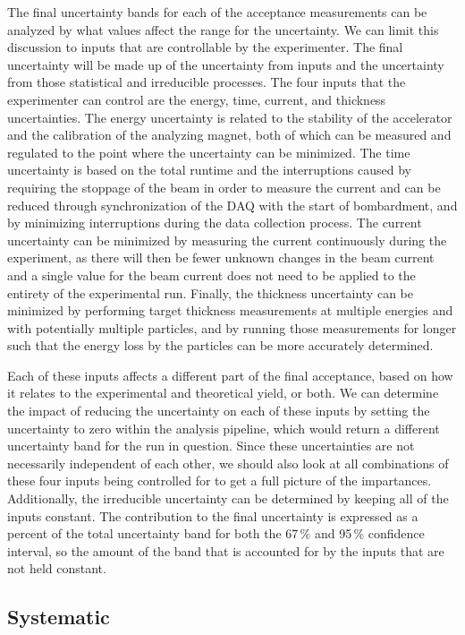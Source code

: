 The final uncertainty bands for each of the acceptance measurements can
be analyzed by what values affect the range for the uncertainty. We can
limit this discussion to inputs that are controllable by the
experimenter. The final uncertainty will be made up of the uncertainty
from inputs and the uncertainty from those statistical and irreducible
processes. The four inputs that the experimenter can control are the
energy, time, current, and thickness uncertainties. The energy
uncertainty is related to the stability of the accelerator and the
calibration of the analyzing magnet, both of which can be measured and
regulated to the point where the uncertainty can be minimized. The time
uncertainty is based on the total runtime and the interruptions caused
by requiring the stoppage of the beam in order to measure the current
and can be reduced through synchronization of the DAQ with the start of
bombardment, and by minimizing interruptions during the data collection
process. The current uncertainty can be minimized by measuring the
current continuously during the experiment, as there will then be fewer
unknown changes in the beam current and a single value for the beam
current does not need to be applied to the entirety of the experimental
run. Finally, the thickness uncertainty can be minimized by performing
target thickness measurements at multiple energies and with potentially
multiple particles, and by running those measurements for longer such
that the energy loss by the particles can be more accurately determined.

Each of these inputs affects a different part of the final acceptance,
based on how it relates to the experimental and theoretical yield, or
both. We can determine the impact of reducing the uncertainty on each of
these inputs by setting the uncertainty to zero within the analysis
pipeline, which would return a different uncertainty band for the run in
question. Since these uncertainties are not necessarily independent of
each other, we should also look at all combinations of these four inputs
being controlled for to get a full picture of the impartances.
Additionally, the irreducible uncertainty can be determined by keeping
all of the inputs constant. The contribution to the final uncertainty is
expressed as a percent of the total uncertainty band for both the 67\,\%
and 95\,\% confidence interval, so the amount of the band that is
accounted for by the inputs that are not held constant.

\subsection{Systematic}

